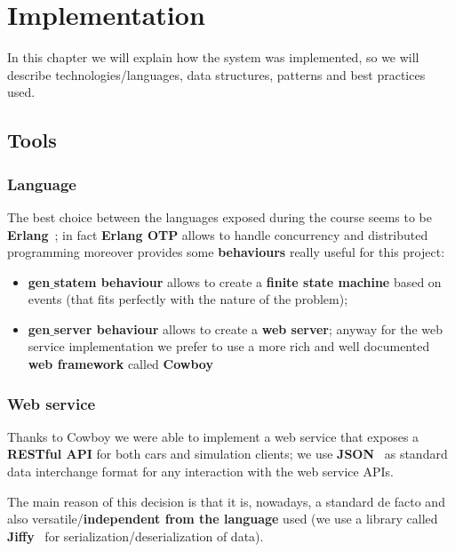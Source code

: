 \chapter{Implementation}\label{ch:implementation}

In this chapter we will explain how the system was implemented, so we will describe 
technologies/languages, data structures, patterns and best practices used.


\section{Tools}


\subsection{Language}


The best choice between the languages exposed during the course seems to be 
\textbf{Erlang}~\cite{3}; 
in fact \textbf{Erlang OTP} allows to handle concurrency and distributed programming
moreover provides some \textbf{behaviours} really useful for this project:
\begin{itemize}
    \item \textbf{gen$\_$statem behaviour} allows to create a \textbf{finite state machine} 
        based on events (that fits perfectly with the nature of the problem);
    \item \textbf{gen$\_$server behaviour} allows to create a \textbf{web server}; 
        anyway for the web service implementation we prefer to use a more 
        rich and well documented \textbf{web framework} called \textbf{Cowboy}~\cite{4}  
\end{itemize}


\subsection{Web service}

Thanks to Cowboy we were able to implement a web service that exposes a \textbf{RESTful API}  
for both cars and simulation clients; we use \textbf{JSON}~\cite{6} as standard data interchange 
format for any interaction with the web service APIs.

The main reason of this decision is that it is, nowadays, a standard de facto and also 
versatile/\textbf{independent from the language} used 
(we use a library called \textbf{Jiffy}~\cite{5} for serialization/deserialization of data).


